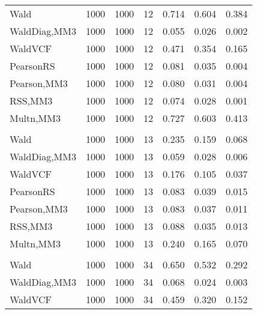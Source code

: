 \documentclass[
]{article}
\begin{document}
\begin{table}[H]
{\begin{tabular}[t]{lrrrrrr}
\hspace{1em}Wald & 1000 & 1000 & 12 & 0.714 & 0.604 & 0.384\\
\hspace{1em}WaldDiag,MM3 & 1000 & 1000 & 12 & 0.055 & 0.026 & 0.002\\
\hspace{1em}WaldVCF & 1000 & 1000 & 12 & 0.471 & 0.354 & 0.165\\
\hspace{1em}PearsonRS & 1000 & 1000 & 12 & 0.081 & 0.035 & 0.004\\
\hspace{1em}Pearson,MM3 & 1000 & 1000 & 12 & 0.080 & 0.031 & 0.004\\
\hspace{1em}RSS,MM3 & 1000 & 1000 & 12 & 0.074 & 0.028 & 0.001\\
\hspace{1em}Multn,MM3 & 1000 & 1000 & 12 & 0.727 & 0.603 & 0.413\\
\addlinespace[0.3em]
\multicolumn{7}{l}{\textbf{2F 10V}}\\
\hspace{1em}Wald & 1000 & 1000 & 13 & 0.235 & 0.159 & 0.068\\
\hspace{1em}WaldDiag,MM3 & 1000 & 1000 & 13 & 0.059 & 0.028 & 0.006\\
\hspace{1em}WaldVCF & 1000 & 1000 & 13 & 0.176 & 0.105 & 0.037\\
\hspace{1em}PearsonRS & 1000 & 1000 & 13 & 0.083 & 0.039 & 0.015\\
\hspace{1em}Pearson,MM3 & 1000 & 1000 & 13 & 0.083 & 0.037 & 0.011\\
\hspace{1em}RSS,MM3 & 1000 & 1000 & 13 & 0.088 & 0.035 & 0.013\\
\hspace{1em}Multn,MM3 & 1000 & 1000 & 13 & 0.240 & 0.165 & 0.070\\
\addlinespace[0.3em]
\multicolumn{7}{l}{\textbf{3F 15V}}\\
\hspace{1em}Wald & 1000 & 1000 & 34 & 0.650 & 0.532 & 0.292\\
\hspace{1em}WaldDiag,MM3 & 1000 & 1000 & 34 & 0.068 & 0.024 & 0.003\\
\hspace{1em}WaldVCF & 1000 & 1000 & 34 & 0.459 & 0.320 & 0.152\\

\end{tabular}}
\end{table}
\end{document}

